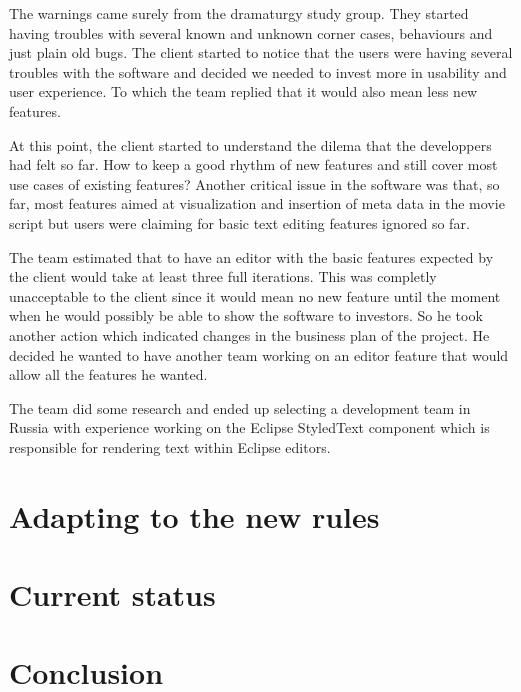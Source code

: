 \documentclass[lnbip]{svmultln}
\begin{document}
The warnings came surely from the dramaturgy study group. They started
having troubles with several known and unknown corner cases,
behaviours and just plain old bugs. The client started to notice that
the users were having several troubles with the software and decided
we needed to invest more in usability and user experience. To which
the team replied that it would also mean less new features.

At this point, the client started to understand the dilema that the
developpers had felt so far. How to keep a good rhythm of new features
and still cover most use cases of existing features? Another critical
issue in the software was that, so far, most features aimed at
visualization and insertion of meta data in the movie script but users
were claiming for basic text editing features ignored so far.

The team estimated that to have an editor with the basic features
expected by the client would take at least three full iterations. This
was completly unacceptable to the client since it would mean no new
feature until the moment when he would possibly be able to show the
software to investors. So he took another action which indicated
changes in the business plan of the project. He decided he wanted to
have another team working on an editor feature that would allow all
the features he wanted.

The team did some research and ended up selecting a development team
in Russia with experience working on the Eclipse StyledText component
which is responsible for rendering text within Eclipse editors.

\section{Adapting to the new rules}
\label{sec:adapting}

\section{Current status}
\label{sec:nowadays}

\section{Conclusion}
\label{sec:conclusion}
\end{document}
